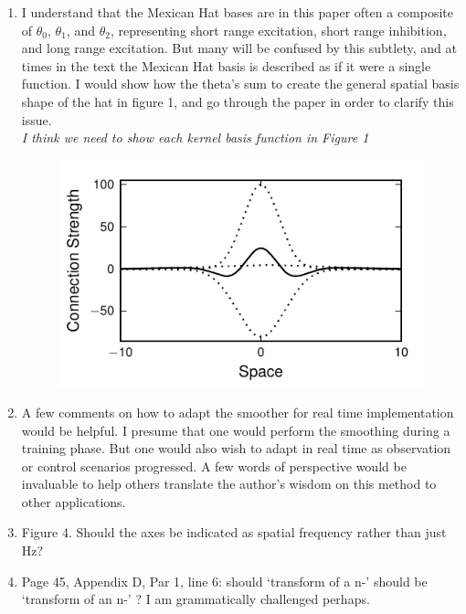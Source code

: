 \documentclass{article}
\begin{document}
\begin{enumerate}
\item I understand that the Mexican Hat bases are in this paper often a composite of $\theta_0$, $\theta_1$, and $\theta_2$, representing short range excitation, short range inhibition, and long range excitation. But many will be confused by this subtlety, and at times in the text the Mexican Hat basis is described as if it were a single function. I would show how the theta's sum to create the general spatial basis shape of the hat in figure 1, and go through the paper in order to clarify this issue.\\
\emph{I think we need to show each kernel basis function in Figure 1}
 \begin{figure}[!ht]
 \begin{center}
 \includegraphics{./Graph/pdf/fig1_revised.pdf} 
 \end{center}
 \caption{}
 \label{fig:Figure1}
 \end{figure}

\item A few comments on how to adapt the smoother for real time implementation would be helpful. I presume that one would perform the smoothing during a training phase. But one would also wish to adapt in real time as observation or control scenarios progressed. A few words of perspective would be invaluable to help others translate the author's wisdom on this method to other applications.
\item Figure 4. Should the axes be indicated as spatial frequency rather than just Hz?
\item Page 45, Appendix D, Par 1, line 6: should `transform of a n-' should be `transform of an n-' ? I am grammatically challenged perhaps.
\end{enumerate}
\end{document}
